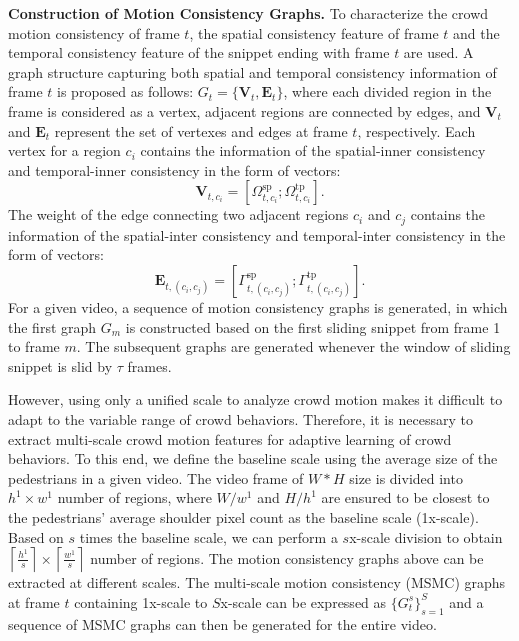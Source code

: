 \documentclass[journal]{IEEEtran}
\begin{document}
\vskip 0.03in
\noindent\textbf{Construction of Motion Consistency Graphs. }
To characterize the crowd motion consistency of frame $t$,
the spatial consistency feature of frame $t$ and the temporal consistency feature of the snippet ending with frame $t$ are used. A graph structure capturing both spatial and temporal consistency information of frame $t$ is proposed as follows:
$ G_{t}=\{ \mathbf{V}_{t}, \mathbf{E}_{t} \} $,
where each divided region in the frame is considered as a vertex, adjacent regions are connected by edges, and $ \mathbf{V}_{t} $ and $ \mathbf{E}_{t} $ represent the set of vertexes and edges at frame $t$, respectively.
Each vertex for a region $c_i$ contains the information of the spatial-inner consistency and temporal-inner consistency in the form of vectors:
$$ \mathbf{V}_{t,c_i} = [ \Omega^{\mathrm{sp}}_{t,c_i}; \Omega^{\mathrm{tp}}_{t,c_i}].  $$
The weight of the edge connecting two adjacent regions $c_i$ and $c_j$ contains the information of the spatial-inter consistency and temporal-inter consistency in the form of vectors:
$$ \mathbf{E}_{t,(c_i,c_j)} =
[ \Gamma^{\mathrm{sp}}_{t,(c_{i},c_{j})} ;
\Gamma^{\mathrm{tp}}_{t,(c_{i},c_{j})}]. $$
For a given video, a sequence of motion consistency graphs is generated, in which the first graph $G_m$ is constructed based on the first sliding snippet from frame 1 to frame $m$. The subsequent graphs are generated whenever the window of sliding snippet is slid by $\tau$ frames.

However, using only a unified scale to analyze crowd motion makes it difficult to adapt to the variable range of crowd behaviors. Therefore, it is necessary to extract multi-scale crowd motion features for adaptive learning of crowd behaviors. To this end, we define the baseline scale using the average size of the pedestrians in a given video. The video frame of $W*H$ size is divided into $h^1 \times w^1$ number of regions, where $W/w^1 $ and $H/h^1 $ are ensured to be closest to the pedestrians' average shoulder pixel count as the baseline scale (1x-scale).
Based on $s$ times the baseline scale, we can perform a $s$x-scale division to obtain $\left \lceil \frac{h^1}{s}  \right \rceil   \times \left \lceil \frac{w^1}{s}  \right \rceil $ number of regions. The motion consistency graphs above can be extracted at different scales. The multi-scale motion consistency (MSMC) graphs at frame $t$ containing 1x-scale to $S$x-scale can be expressed as $ \{G_{t}^{s}\}_{s=1}^{S}$ and a sequence of MSMC graphs can then be generated for the entire video.
\end{document}

